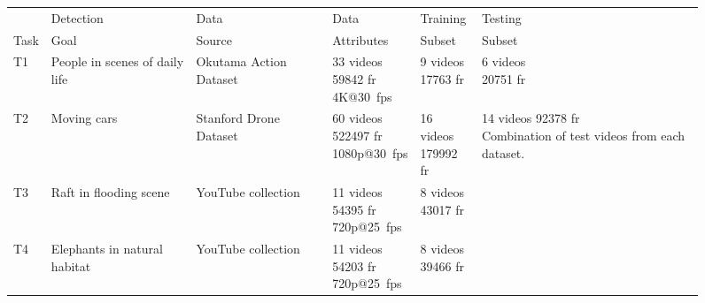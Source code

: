 \begin{figure}
\centering
\begin{tabular}{|p{1cm}|p{2.5cm}|p{2.5cm}|p{2.5cm}|p{2.5cm}|p{2.5cm}|}
\hline
   & Detection & Data & Data & Training & Testing \\ 
Task& Goal & Source & Attributes & Subset & Subset\\ 
\hline
T1 & {\small People in scenes of daily life}&{\small Okutama Action Dataset~\cite{Barekatain2017}}&\makecell[tl]{\small 33 videos \\\small 59842 fr\\\small 4K@30~fps}&\makecell[tl]{\small 9 videos\\\small 17763 fr}&\makecell[tl]{\small 6 videos\\\small 20751 fr}\\ 
\hline
T2 &{\small Moving cars}&{\small Stanford Drone Dataset~\cite{Robicquet2016}}&\makecell[tl]{\small 60 videos \\\small 522497 fr\\\small 1080p@30~fps}&\makecell[tl]{\small 16 videos\\\small 179992 fr} & \multirow{4}{*}{\parbox{1.5cm}{\centering\small 14 videos 92378 fr\\ Combination of test videos from each dataset.}} \\ \cline{1-5}
T3 &{\small Raft in flooding scene}&{\small YouTube collection~\cite{YouTube1}}&\makecell[tl]{\small 11 videos \\\small 54395 fr\\\small 720p@25~fps}&\makecell[tl]{\small 8 videos\\\small 43017 fr} & \\ \cline{1-5}
T4 &{\small Elephants in natural habitat}&{\small YouTube collection~\cite{YouTube2}}&\makecell[tl]{\small 11 videos \\\small 54203 fr\\\small 720p@25~fps}&\makecell[tl]{\small 8 videos\\\small 39466 fr} & \\ \cline{1-5}

\end{tabular}
\end{figure}
